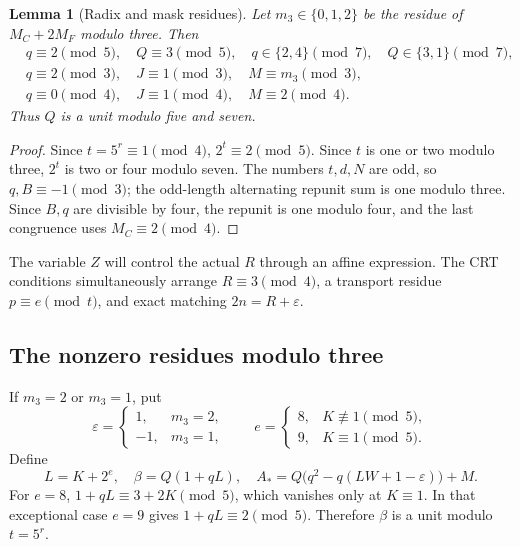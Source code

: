 \documentclass[11pt,letterpaper]{article}
\newtheorem{lemma}[theorem]{Lemma}
\theoremstyle{definition}\newtheorem{definition}[theorem]{Definition}
\theoremstyle{remark}\newtheorem{remark}[theorem]{Remark}
\begin{document}
\begin{lemma}[Radix and mask residues]
\label{fup:sp:lem:residues}
Let $m_3\in\{0,1,2\}$ be the residue of $M_C+2M_F$ modulo three.
Then
\begin{align}
&q\equiv2\pmod5,\quad Q\equiv3\pmod5,\quad
q\in\{2,4\}\pmod7,\quad Q\in\{3,1\}\pmod7,\label{fup:sp:eq:57}\\
&q\equiv2\pmod3,\quad J\equiv1\pmod3,\quad M\equiv m_3\pmod3,\label{fup:sp:eq:3}\\
&q\equiv0\pmod4,\quad J\equiv1\pmod4,\quad M\equiv2\pmod4.\label{fup:sp:eq:4}
\end{align}
Thus $Q$ is a unit modulo five and seven.
\end{lemma}
\begin{proof}
Since $t=5^r\equiv1\pmod4$, $2^t\equiv2\pmod5$.
Since $t$ is one or two modulo three, $2^t$ is two or four modulo
seven. The numbers $t,d,N$ are odd, so $q,B\equiv-1\pmod3$;
the odd-length alternating repunit sum is one modulo three.
Since $B,q$ are divisible by four, the repunit is one modulo four,
and the last congruence uses $M_C\equiv2\pmod4$.
\end{proof}

The variable $Z$ will control the actual $R$ through an affine
expression. The CRT conditions simultaneously arrange $R\equiv3\pmod4$,
a transport residue $p\equiv e\pmod t$, and exact matching
$2n=R+\varepsilon$.

\subsection{The nonzero residues modulo three}
\label{fup:sp:sec:branchA}
If $m_3=2$ or $m_3=1$, put
\[
\varepsilon=\begin{cases}1,&m_3=2,\\-1,&m_3=1,\end{cases}
\qquad
e=\begin{cases}8,&K\not\equiv1\pmod5,\\9,&K\equiv1\pmod5.\end{cases}
\]
Define
\begin{equation}
L=K+2^e,\quad \beta=Q(1+qL),\quad
A_*=Q\bigl(q^2-q(LW+1-\varepsilon)\bigr)+M.
\label{fup:sp:eq:AstarA}
\end{equation}
For $e=8$, $1+qL\equiv3+2K\pmod5$, which vanishes only at $K\equiv1$.
In that exceptional case $e=9$ gives $1+qL\equiv2\pmod5$.
Therefore $\beta$ is a unit modulo $t=5^r$.
\end{document}
